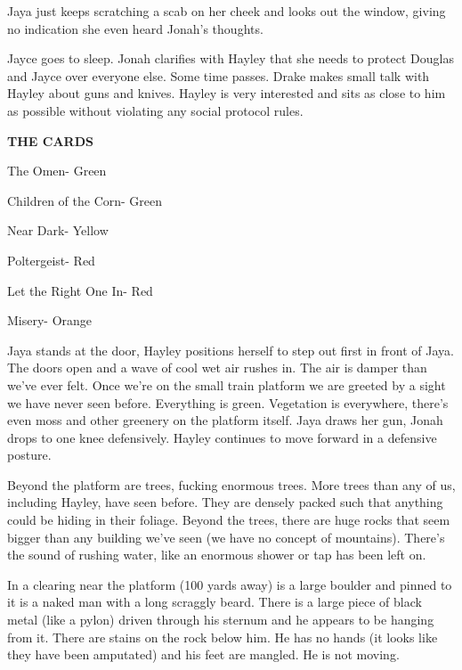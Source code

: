 
Jaya just keeps scratching a scab on her cheek and looks out the window, giving no indication she even heard Jonah's thoughts.  


Jayce goes to sleep.  Jonah clarifies with Hayley that she needs to protect Douglas and Jayce over everyone else.  Some time passes.  Drake makes small talk with Hayley about guns and knives.  Hayley is very interested and sits as close to him as possible without violating any social protocol rules.





\textbf{THE CARDS }

{\parskip=0pt
The Omen- Green

Children of the Corn- Green

Near Dark- Yellow

Poltergeist- Red

Let the Right One In- Red

Misery- Orange
}


Jaya stands at the door, Hayley positions herself to step out first in front of Jaya.  The doors open and a wave of cool wet air rushes in.  The air is damper than we've ever felt.  Once we're on the small train platform we are greeted by a sight we have never seen before.  Everything is green.  Vegetation is everywhere, there's even moss and other greenery on the platform itself.  Jaya draws her gun, Jonah drops to one knee defensively.  Hayley continues to move forward in a defensive posture.



Beyond the platform are trees, fucking enormous trees.  More trees than any of us, including Hayley, have seen before.  They are densely packed such that anything could be hiding in their foliage.  Beyond the trees, there are huge rocks that seem bigger than any building we've seen (we have no concept of mountains).  There's the sound of rushing water, like an enormous shower or tap has been left on.  



In a clearing near the platform (100 yards away) is a large boulder and pinned to it is a naked man with a long scraggly beard.  There is a large piece of black metal (like a pylon) driven through his sternum and he appears to be hanging from it. There are stains on the rock below him.  He has no hands (it looks like they have been amputated) and his feet are mangled.  He is not moving.



